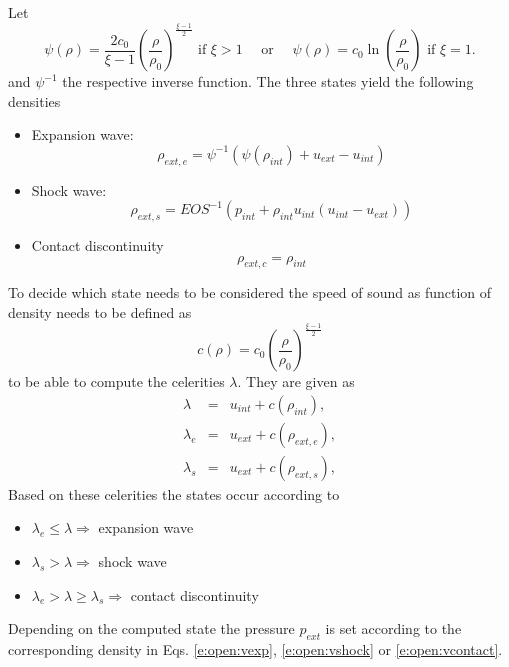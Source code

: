 \documentclass[12pt]{memoir}
\begin{document}
Let
\begin{equation}
\psi(\rho) = \frac{2 c_0}{\xi - 1}\left( \frac{\rho}{\rho_0}
\right)^{\frac{\xi-1}{2}}\mbox{ if } \xi > 1 \quad \mbox{ or } \quad
\psi(\rho) = c_0 \ln\left( \frac{\rho}{\rho_0} \right) \mbox{ if } \xi =
1.
\label{e:open:psi}
\end{equation}
and $\psi^{-1}$ the respective inverse function. The three states yield
the following densities
\begin{itemize}
  \item Expansion wave:
  \begin{equation}
  \rho_{ext,e} = \psi^{-1}(\psi(\rho_{int}) +
  u_{ext} - u_{int})
  \label{e:open:vexp}
  \end{equation}
  \item Shock wave:
  \begin{equation}
  \rho_{ext,s} = EOS^{-1}(p_{int} + \rho_{int}
  u_{int} (u_{int} - u_{ext}))
  \label{e:open:vshock}
  \end{equation}
  \item Contact discontinuity
  \begin{equation}
  \rho_{ext,c} = \rho_{int}
  \label{e:open:vcontact}
  \end{equation}
\end{itemize}
To decide which state needs to be considered the speed of sound as
function of density needs to be defined as
\begin{equation}
c(\rho) = c_0 \left( \frac{\rho}{\rho_0} \right)^{\frac{\xi - 1}{2}}
\label{e:open:speedofsound}
\end{equation}
to be able to compute the celerities $\lambda$. They are given as
\begin{eqnarray}
\lambda &=& u_{int} + c(\rho_{int}),
\label{e:open:lambda}
\\
\lambda_e &=& u_{ext} + c(\rho_{ext,e}),
\label{e:open:vlambda_e}
\\
\lambda_s &=& u_{ext} + c(\rho_{ext,s}),
\label{e:open:vlambda_s}
\end{eqnarray}
Based on these celerities the states occur according to
\begin{itemize}
  \item $\lambda_e \le \lambda \Rightarrow$ expansion wave
  \item $\lambda_s > \lambda \Rightarrow$ shock wave
  \item $\lambda_e > \lambda \ge \lambda_s \Rightarrow$ contact
  discontinuity
\end{itemize}
Depending on the computed state the pressure $p_{ext}$ is set according
to the corresponding density in Eqs. \eqref{e:open:vexp},
\eqref{e:open:vshock} or \eqref{e:open:vcontact}.
\end{document}
